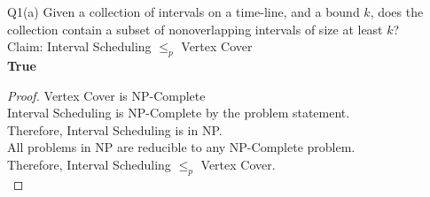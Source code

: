 \begin{problem}
    {Q1(a)}
    Given a collection of intervals on a time-line, and a bound $k$, does the collection contain a subset of nonoverlapping intervals of size at least $k$? \\
    Claim: Interval Scheduling $\leq_p$ Vertex Cover \\
    \textbf{True} \\
    \begin{proof}
        Vertex Cover is NP-Complete \\
        Interval Scheduling is NP-Complete by the problem statement. \\
        Therefore, Interval Scheduling is in NP. \\
        All problems in NP are reducible to any NP-Complete problem. \\
        Therefore, Interval Scheduling $\leq_p$ Vertex Cover. \\
    \end{proof}
\end{problem}
